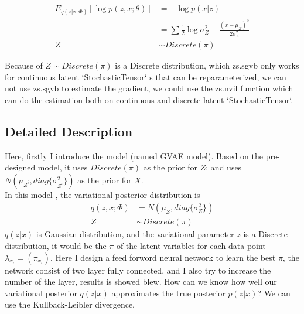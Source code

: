 \documentclass[a4paper]{article}
\begin{document}
\begin{equation}
    \begin{aligned}
        E_{q(z|x;\Phi)}[\log p(z,x;\theta)]  &= - \log p(x|z)\\
        & = \sum \frac{1}{2} \log{\sigma_Z^2} +  \frac{(x-\mu_Z)^2}{2\sigma_Z^2} \\
        Z &\sim Discrete(\pi)
 \end{aligned}
\end{equation} 

Because of $Z \sim Discrete(\pi)$ is a Discrete distribution, which zs.sgvb only works for continuous latent  `StochasticTensor` s that can be reparameterized, we can not use zs.sgvb to 
estimate the gradient, we could use the zs.nvil function which can do the estimation both on continuous and discrete latent  `StochasticTensor`.

\subsection{Detailed Description}
Here, firstly I introduce the model (named GVAE model). Based on the 
pre-designed model,  it uses $Discrete(\pi)$ as the prior for $Z$; and uses 
$N(\mu_{Z^{i}}, diag\{\sigma_{Z^{i}}^{2}\})$ as the prior for $X$.
\\


In this model , the variational posterior distribution is 
\begin{equation}
    \begin{aligned}
        q(z,x;\Phi) &=  N(\mu_{Z}, diag\{\sigma_Z^2\})\\
        Z &\sim Discrete(\pi)
    \end{aligned}
\end{equation} 
 $q(z|x)$ is Gaussian distribution, and the variational parameter $z$ is a Discrete distribution, it would be the $\pi$ of the latent variables for each data point $\lambda_{x_i} = (\pi_{x_i})$, 
Here I design a feed forword neural network to learn the best $\pi$, the network consist of two layer fully connected, and I also try to increase the number of the layer, results is showed blew.
 How can we know how well our variational posterior $q(z|x)$ approximates the true posterior $p(z|x)$? We can use the Kullback-Leibler divergence.
\end{document}
